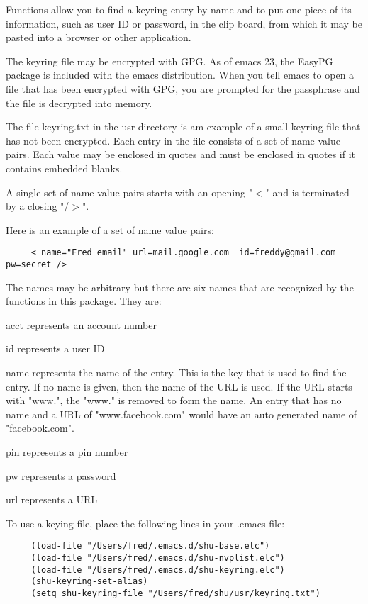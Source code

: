 Functions allow you to find a keyring entry by name and to put one piece of
its information, such as user ID or password, in the clip board, from which it
may be pasted into a browser or other application.

The keyring file may be encrypted with GPG.  As of emacs 23, the EasyPG
package is included with the emacs distribution.  When you tell emacs to open
a file that has been encrypted with GPG, you are prompted for the passphrase
and the file is decrypted into memory.

The file keyring.txt in the usr directory is am example of a small
keyring file that has not been encrypted.  Each entry in the file consists of
a set of name value pairs.  Each value may be enclosed in quotes and must be
enclosed in quotes if it contains embedded blanks.

A single set of name value pairs starts with an opening "$<$" and is terminated
by a closing "/$>$".

Here is an example of a set of name value pairs:

\small{\begin{verbatim}
     < name="Fred email" url=mail.google.com  id=freddy@gmail.com  pw=secret />
\end{verbatim}}

The names may be arbitrary but there are six names that are recognized by the
functions in this package.  They are:

acct represents an account number

id represents a user ID

name represents the name of the entry.  This is the key that is used to find
the entry.  If no name is given, then the name of the URL is used.  If the URL
starts with "www.", the "www." is removed to form the name.  An entry that has
no name and a URL of "www.facebook.com" would have an auto generated name of
"facebook.com".

pin represents a pin number

pw represents a password

url represents a URL

To use a keying file, place the following lines in your .emacs file:

\small{\begin{verbatim}
     (load-file "/Users/fred/.emacs.d/shu-base.elc")
     (load-file "/Users/fred/.emacs.d/shu-nvplist.elc")
     (load-file "/Users/fred/.emacs.d/shu-keyring.elc")
     (shu-keyring-set-alias)
     (setq shu-keyring-file "/Users/fred/shu/usr/keyring.txt")
\end{verbatim}}

